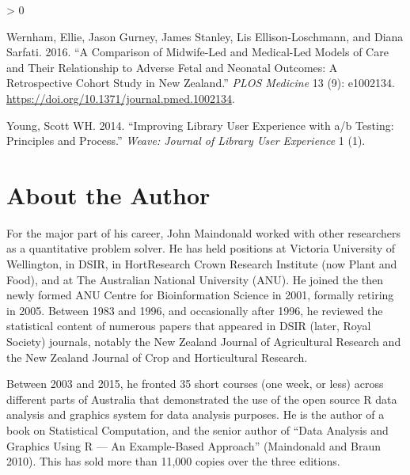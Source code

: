 \documentclass[
  10pt,
  b5paper]{book}
\newlength{\cslhangindent}
\newenvironment{CSLReferences}[2] %
 {%
  \setlength{\parindent}{0pt}
  \ifodd #1 \everypar{\setlength{\hangindent}{\cslhangindent}}\ignorespaces\fi
  \ifnum #2 > 0
  \setlength{\parskip}{#2\baselineskip}
  \fi
 }%
 {}
\begin{document}
\begin{CSLReferences}{1}{0}
\leavevmode\hypertarget{ref-wernham_EtAl_2016}{}%
Wernham, Ellie, Jason Gurney, James Stanley, Lis Ellison-Loschmann, and Diana Sarfati. 2016. {``A Comparison of Midwife-Led and Medical-Led Models of Care and Their Relationship to Adverse Fetal and Neonatal Outcomes: A Retrospective Cohort Study in New Zealand.''} \emph{PLOS Medicine} 13 (9): e1002134. \url{https://doi.org/10.1371/journal.pmed.1002134}.

\leavevmode\hypertarget{ref-young2014improving}{}%
Young, Scott WH. 2014. {``Improving Library User Experience with a/b Testing: Principles and Process.''} \emph{Weave: Journal of Library User Experience} 1 (1).

\end{CSLReferences}

\hypertarget{about-the-author}{%
\chapter*{About the Author}\label{about-the-author}}

For the major part of his career, John Maindonald worked with other
researchers as a quantitative problem solver.
He has held positions at Victoria University of Wellington, in DSIR, in HortResearch Crown Research Institute (now Plant and Food), and at The Australian National University (ANU). He joined the then newly formed ANU Centre for Bioinformation Science in 2001, formally retiring in 2005.
Between 1983 and 1996, and occasionally after 1996, he reviewed the statistical content of numerous papers that appeared in DSIR (later, Royal Society) journals, notably the New Zealand Journal of Agricultural Research and the New Zealand Journal of Crop and Horticultural Research.

Between 2003 and 2015, he fronted 35 short courses (one week, or less)
across different parts of Australia that demonstrated the use of the open source R data analysis and graphics system for data analysis purposes.
He is the author of a book on Statistical Computation, and the senior author of ``Data Analysis and Graphics Using R --- An Example-Based Approach'' (Maindonald and Braun 2010). This has sold more than 11,000 copies over
the three editions.
\end{document}
